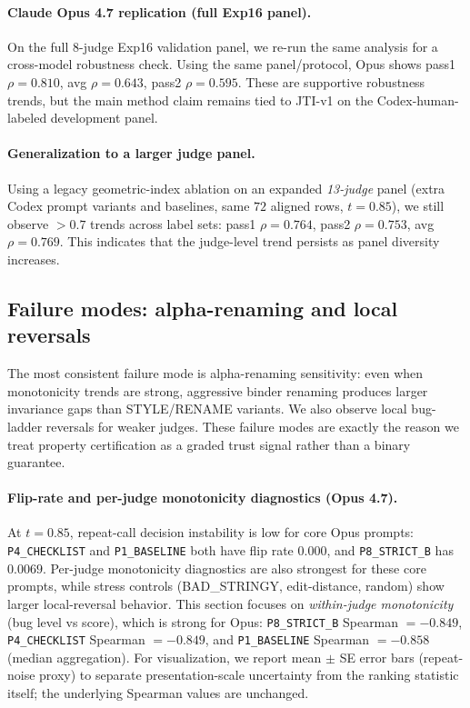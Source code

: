 \documentclass{article}
\begin{document}
\paragraph{Claude Opus 4.7 replication (full Exp16 panel).}
On the full \(8\)-judge Exp16 validation panel, we re-run the same analysis for a cross-model robustness check.
Using the same panel/protocol, Opus shows pass1 \(\rho=0.810\), avg \(\rho=0.643\), pass2 \(\rho=0.595\).
These are supportive robustness trends, but the main method claim remains tied to JTI-v1 on the Codex-human-labeled development panel.

\paragraph{Generalization to a larger judge panel.}
Using a legacy geometric-index ablation on an expanded \emph{13-judge} panel (extra Codex prompt variants and baselines, same \(72\) aligned rows, \(t=0.85\)),
we still observe \(>0.7\) trends across label sets:
pass1 \(\rho=0.764\), pass2 \(\rho=0.753\), avg \(\rho=0.769\).
This indicates that the judge-level trend persists as panel diversity increases.

\subsection{Failure modes: alpha-renaming and local reversals}
The most consistent failure mode is alpha-renaming sensitivity: even when monotonicity trends are strong, aggressive binder renaming produces larger invariance gaps than STYLE/RENAME variants.
We also observe local bug-ladder reversals for weaker judges.
These failure modes are exactly the reason we treat property certification as a graded trust signal rather than a binary guarantee.

\paragraph{Flip-rate and per-judge monotonicity diagnostics (Opus 4.7).}
At \(t=0.85\), repeat-call decision instability is low for core Opus prompts:
\texttt{P4\_CHECKLIST} and \texttt{P1\_BASELINE} both have flip rate \(0.000\), and \texttt{P8\_STRICT\_B} has \(0.0069\).
Per-judge monotonicity diagnostics are also strongest for these core prompts, while stress controls (BAD\_STRINGY, edit-distance, random) show larger local-reversal behavior.
This section focuses on \emph{within-judge monotonicity} (bug level vs score), which is strong for Opus:
\texttt{P8\_STRICT\_B} Spearman \(=-0.849\), \texttt{P4\_CHECKLIST} Spearman \(=-0.849\), and \texttt{P1\_BASELINE} Spearman \(=-0.858\) (median aggregation).
For visualization, we report mean \(\pm\) SE error bars (repeat-noise proxy) to separate presentation-scale uncertainty from the ranking statistic itself; the underlying Spearman values are unchanged.
\end{document}
